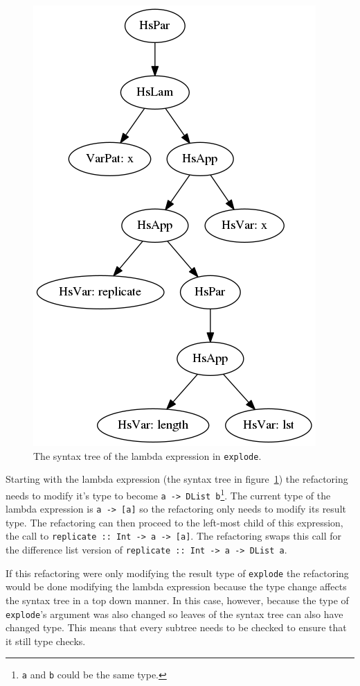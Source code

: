 \begin{figure}[h]\label{explodeLam}
	\begin{center}
		\includegraphics[scale=.5]{graphVis/Chapter3/explodeLam.png}
	\end{center}
	\caption{The syntax tree of the lambda expression in \texttt{explode}.}
\end{figure}

Starting with the lambda expression (the syntax tree in figure~\ref{explodeLam}) the refactoring needs to modify it's type to become \texttt{a -> DList b}\footnote{\texttt{a} and \texttt{b} could be the same type.}. The current type of the lambda expression is \texttt{a -> [a]} so the refactoring only needs to modify its result type. The refactoring can then proceed to the left-most child of this expression, the call to \texttt{replicate :: Int -> a -> [a]}. The refactoring swaps this call for the difference list version of \texttt{replicate :: Int -> a -> DList a}. 

If this refactoring were only modifying the result type of \texttt{explode} the refactoring would be done modifying the lambda expression because the type change affects the syntax tree in a top down manner. In this case, however, because  the type of \texttt{explode}'s argument was also changed so leaves of the syntax tree can also have changed type. This means that every subtree needs to be checked to ensure that it still type checks.

